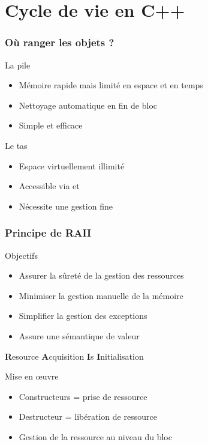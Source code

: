 \documentclass[svgnames]{beamer}
\begin{document}
\section{Cycle de vie en C++}
\frame
{
  \frametitle{Où ranger les objets ?}
  \begin{block}{La pile}
  \begin{itemize}
  \item Mémoire rapide mais limité en espace et en temps
  \item Nettoyage automatique en fin de bloc
  \item Simple et efficace
  \end{itemize}
  \end{block}


  \begin{block}{Le tas}
  \begin{itemize}
  \item Espace virtuellement illimité
  \item Accessible via  et 
  \item Nécessite une gestion fine
  \end{itemize}
  \end{block}
}

\frame
{
  \frametitle{Principe de RAII}
  \begin{block}{Objectifs}
  \begin{itemize}\footnotesize
  \item Assurer la sûreté de la gestion des ressources
  \item Minimiser la gestion manuelle de la mémoire
  \item Simplifier la gestion des exceptions
  \item Assure une sémantique de valeur
  \end{itemize}
  \end{block}
  
  \begin{center}
  \textbf{R}esource \textbf{A}cquisition \textbf{I}s \textbf{I}nitialisation
  \end{center}

  \begin{block}{Mise en \oe{uvre}}
  \begin{itemize}\footnotesize
  \item Constructeurs = prise de ressource
  \item Destructeur = libération de ressource
  \item Gestion de la ressource au niveau du bloc
  \end{itemize}
  \end{block}
}
\end{document}
